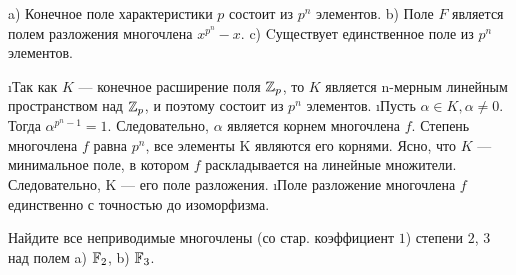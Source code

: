 \begin{problem}
a) Конечное поле характеристики $p$ состоит из $p^n$ элементов. 
b) Поле $F$ является полем разложения многочлена $x^{p^n}-x$. 
c) Cуществует единственное поле из $p^n$ элементов.
\end{problem}

\begin{solution}
\begin{enumerate}
\def\labelenumi{\alph{enumi})}
\i Так как \(K\) --- конечное расширение поля \(\mathbb{Z}_p\), то \(K\) является n-мерным линейным пространством над \(\mathbb{Z}_p\), и поэтому состоит из \(p^n\) элементов.
\i Пусть \(\alpha \in K, \alpha \ne 0\). Тогда \(\alpha^{p^n-1} = 1\). Следовательно, \(\alpha\) является корнем многочлена \(f\). Степень многочлена \(f\) равна \(p^n\), все элементы K являются его корнями. Ясно, что \(K\) --- минимальное поле, в котором \(f\) раскладывается на линейные множители. Следовательно, K --- его поле разложения.
\i Поле разложение многочлена \(f\) единственно с точностью до изоморфизма.
\end{enumerate}
\end{solution}

\begin{problem}[44 (11.2)]
Найдите все неприводимые многочлены (со стар. коэффициент $1$) степени $2$, $3$ над полем a) $\mathbb{F}_2$, b) $\mathbb{F}_3$.
\end{problem}

